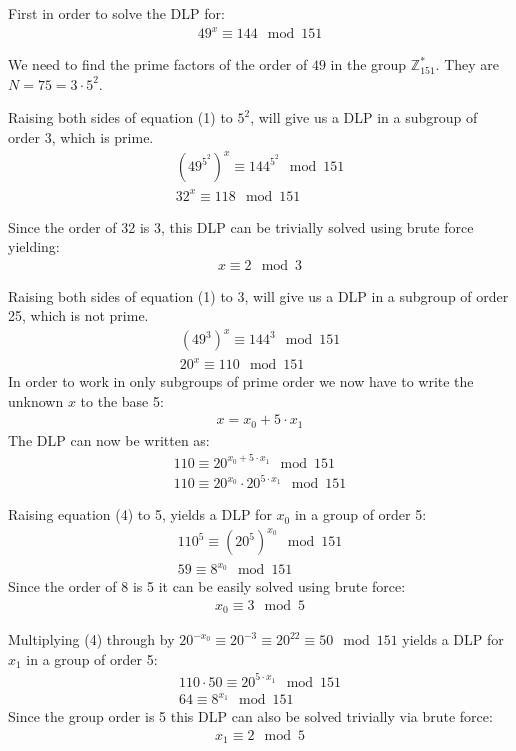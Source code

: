 First in order to solve the DLP for:
\begin{eqnarray}
    49^{x} \equiv 144 \mod 151
\end{eqnarray}

We need to find the prime factors of the order of $49$ in the group 
$\mathbb{Z}^{*}_{151}$. They are $N = 75 = 3 \cdot 5^{2}$.

Raising both sides of equation (1) to $5^{2}$, will give us a DLP in a subgroup of order 3, which is prime.
\begin{eqnarray*}
    (49^{5^{2}})^{x} \equiv 144^{5^{2}} \mod 151 \\
    32^{x} \equiv 118 \mod 151
\end{eqnarray*}

Since the order of 32 is 3, this DLP can be trivially solved using brute force yielding:
\begin{eqnarray}
    x \equiv 2 \mod 3
\end{eqnarray}


Raising both sides of equation (1) to $3$, will give us a DLP in a subgroup of order 25, which is not prime.
\begin{eqnarray*}
    (49^{3})^{x} \equiv 144^{3} \mod 151 \\
    20^{x} \equiv 110 \mod 151
\end{eqnarray*}
In order to work in only subgroups of prime order we now have to write the unknown $x$ to the base 5:
\begin{eqnarray*}
    x = x_{0} + 5 \cdot x_{1}
\end{eqnarray*}
The DLP can now be written as:
\begin{eqnarray}
    110 \equiv 20^{x_0 + 5 \cdot x_{1}} \mod 151 \\
    110 \equiv 20^{x_0} \cdot 20^{5 \cdot x_{1}} \mod 151
\end{eqnarray}

Raising equation (4) to 5, yields a DLP for $x_{0}$ in a group of order 5:
\begin{eqnarray*}
    110^{5} \equiv (20^{5})^{x_0} \mod 151 \\ 
    59 \equiv 8^{x_{0}} \mod 151
\end{eqnarray*}
Since the order of 8 is 5 it can be easily solved using brute force:
\begin{eqnarray}
    x_{0} \equiv 3 \mod 5
\end{eqnarray}

Multiplying (4) through by $20^{-x_{0}} \equiv 20^{-3} \equiv 20^{22} \equiv 50 \mod 151$ yields a DLP for $x_{1}$ in a group of order 5:
\begin{eqnarray*}
    110 \cdot 50 \equiv 20^{5 \cdot x_{1}} \mod 151 \\
    64 \equiv 8^{x_{1}} \mod 151
\end{eqnarray*}
Since the group order is 5 this DLP can also be solved trivially via brute force:
\begin{eqnarray}
    x_{1} \equiv 2 \mod 5
\end{eqnarray}

